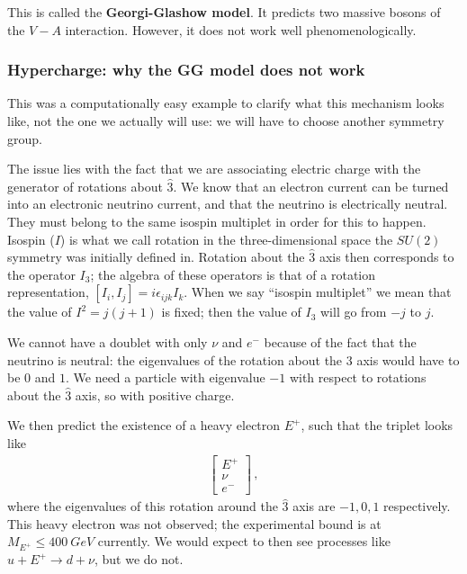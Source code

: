 \documentclass[main.tex]{subfiles}
\begin{document}
This is called the \textbf{Georgi-Glashow model}. It predicts two massive bosons of the \(V-A\) interaction. 
However, it does not work well phenomenologically. 

\subsubsection{Hypercharge: why the GG model does not work}

This was a computationally easy example to clarify what this mechanism looks like, not the one we actually will use: we will have to choose another symmetry group.

The issue lies with the fact that we are associating electric charge with the generator of rotations about \(\hat{3}\).
We know that an electron current can be turned into an electronic neutrino current, and that the neutrino is electrically neutral.
They must belong to the same isospin multiplet in order for this to happen.
Isospin (\(I\)) is what we call rotation in the three-dimensional space the \(SU(2)\) symmetry was initially defined in. 
Rotation about the \(\hat{3}\) axis then corresponds to the operator \(I_3\); the algebra of these operators is that of a rotation representation, \([I_i, I_j] = i \epsilon_{ijk} I_k\).
When we say ``isospin multiplet'' we mean that the value of \(I^2 = j (j+1)\) is fixed; then the value of \(I_3\) will go from \(-j\) to \(j\).

We cannot have a doublet with only \(\nu \) and \(e^{-}\) because of the fact that the neutrino is neutral: the eigenvalues of the rotation about the \(3\) axis would have to be \(0\) and \(1\).
We need a particle with eigenvalue \(-1\) with respect to rotations about the \(\hat{3}\) axis, so with positive charge.

We then predict the existence of a heavy electron \(E^{+}\), such that the triplet looks like 
%
\begin{align}
\left[\begin{array}{c}
E^{+} \\ 
\nu  \\ 
e^{-}
\end{array}\right]
\,,
\end{align}
%
where the eigenvalues of this rotation around the \(\hat{3}\) axis are \(-1, 0, 1 \) respectively.
This heavy electron was not observed; the experimental bound is at \(M_{E^{+}}\leq \SI{400}{GeV}\) currently. 
We would expect to then see processes like \(u + E^{+} \to d + \nu \), but we do not.
\end{document}
